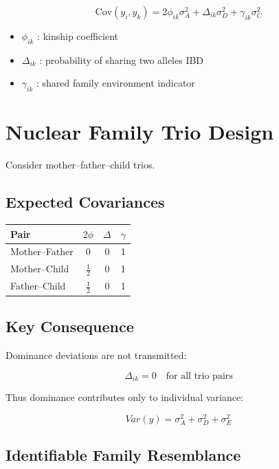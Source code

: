 \documentclass[12pt]{article}
\begin{document}
\[
\text{Cov}(y_i,y_k)
= 2\phi_{ik}\sigma_A^2
+ \Delta_{ik}\sigma_D^2
+ \gamma_{ik}\sigma_C^2
\]

\begin{itemize}
\item $\phi_{ik}$ : kinship coefficient
\item $\Delta_{ik}$ : probability of sharing two alleles IBD
\item $\gamma_{ik}$ : shared family environment indicator
\end{itemize}

\section{Nuclear Family Trio Design}

Consider mother--father--child trios.

\subsection{Expected Covariances}

\begin{center}
\begin{tabular}{lccc}
\toprule
Pair & $2\phi$ & $\Delta$ & $\gamma$ \\ \midrule
Mother--Father & 0 & 0 & 1 \\
Mother--Child  & $\tfrac12$ & 0 & 1 \\
Father--Child  & $\tfrac12$ & 0 & 1 \\
\bottomrule
\end{tabular}
\end{center}

\subsection{Key Consequence}

Dominance deviations are not transmitted:

\[
\Delta_{ik}=0 \quad \text{for all trio pairs}
\]

Thus dominance contributes only to individual variance:

\[
Var(y)=\sigma_A^2+\sigma_D^2+\sigma_E^2
\]

\subsection{Identifiable Family Resemblance}
\end{document}
